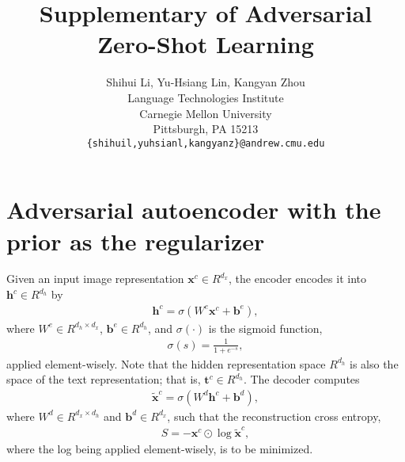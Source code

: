 \documentclass{article}
\title{Supplementary of Adversarial Zero-Shot Learning}
\author{
	Shihui Li, Yu-Hsiang Lin, Kangyan Zhou
		\\
	Language Technologies Institute\\
	Carnegie Mellon University\\
	Pittsburgh, PA 15213 \\
	\texttt{\{shihuil,yuhsianl,kangyanz\}@andrew.cmu.edu} \\
}
\newcommand{\bb}[1]{\boldsymbol{#1}}
\begin{document}

\maketitle







\section{Adversarial autoencoder with the prior as the regularizer}

	Given an input image representation $\bb{x}^c \in R^{d_x}$, the encoder encodes it into $\bb{h}^c \in R^{d_h}$ by
	\begin{align}
		\bb{h}^c = \sigma(W^e \bb{x}^c + \bb{b}^e),
	\end{align}
	where $W^e \in R^{d_h \times d_x}$, $\bb{b}^e \in R^{d_h}$, and $\sigma(\cdot)$ is the sigmoid function,
	\begin{align}
		\sigma(s) = \frac{1}{1 + e^{-s}},
	\end{align}
	applied element-wisely. Note that the hidden representation space $R^{d_h}$ is also the space of the text representation; that is, $\bb{t}^c \in R^{d_h}$. The decoder computes
	\begin{align}
		\tilde{\bb{x}}^c = \sigma(W^d \bb{h}^c + \bb{b}^d),
	\end{align}
	where $W^d \in R^{d_x \times d_h}$ and $\bb{b}^d \in R^{d_x}$, such that the reconstruction cross entropy,
	\begin{align}
		S = -\bb{x}^c \odot \log \tilde{\bb{x}}^c,
	\end{align}
	where the log being applied element-wisely, is to be minimized.
	
\end{document}
